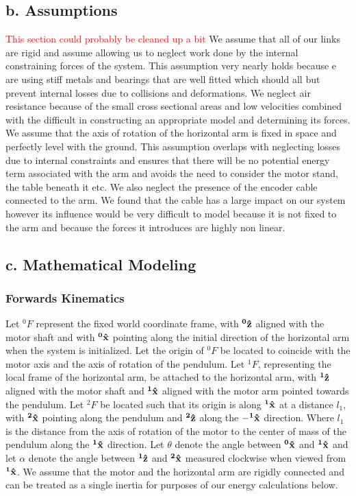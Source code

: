 \documentclass{article}
\newcommand{\xxx}[1]{\textcolor{red}{#1}}
\theoremstyle{plain}
\theoremstyle{definition}
\theoremstyle{remark}
\begin{document}
\subsection*{b. Assumptions}
\xxx{This section could probably be cleaned up a bit}
We assume that all of our links are rigid and assume allowing us to neglect work done by the internal constraining forces of the system.  This assumption very nearly holds because e are using stiff metals and bearings that are well fitted which should all but prevent internal losses due to collisions and deformations.  We neglect air resistance because of the small cross sectional areas and low velocities combined with the difficult in constructing an appropriate model and determining its forces.  We assume that the axis of rotation of the horizontal arm is fixed in space and perfectly level with the ground.  This assumption overlaps with neglecting losses due to internal constraints and ensures that there will be no potential energy term associated with the arm and avoids the need to consider the motor stand, the table beneath it etc.  We also neglect the presence of the encoder cable connected to the arm.  We found that the cable has a large impact on our system however its influence would be very difficult to model because it is not fixed to the arm and because the forces it introduces are highly non linear. 

\subsection*{c. Mathematical Modeling}
\subsubsection*{Forwards Kinematics}
Let $^0F$ represent the fixed world coordinate frame, with $\bf{^0\hat{z}}$ aligned with the motor shaft and with $\bf{^0\hat{x}}$ pointing along the initial direction of the horizontal arm when the system is initialized.  Let the origin of $^0F$ be located to coincide with the motor axis and the axis of rotation of the pendulum.  Let $^1F$, representing the local frame of the horizontal arm, be attached to the horizontal arm, with $\bf{^1\hat{z}}$ aligned with the motor shaft and $\bf{^1\hat{x}}$ aligned with the motor arm pointed towards the pendulum.  Let $^2F$ be located such that its origin is along $\bf{^1\hat{x}}$ at a distance $l_1$, with $\bf{^2\hat{x}}$ pointing along the pendulum and $\bf{^2\hat{z}}$ along the $\bf{-^1\hat{x}}$ direction.  Where $l_1$ is the distance from the axis of rotation of the motor to the center of mass of the pendulum along the $\bf{^1\hat{x}}$ direction.  Let $\theta$ denote the angle between $\bf{^0\hat{x}}$ and $\bf{^1\hat{x}}$ and let $\alpha$ denote the angle between $\bf{^1\hat{z}}$ and $\bf{^2\hat{x}}$ measured clockwise when viewed from $\bf{^1\hat{x}}$.  We assume that the motor and the horizontal arm are rigidly connected and can be treated as a single inertia for purposes of our energy calculations below.
\end{document}
